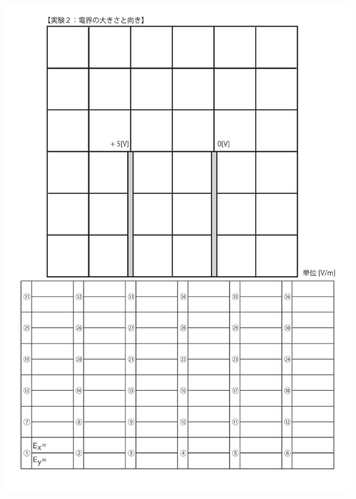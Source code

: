 \documentclass[uplatex,a4paper,11pt,oneside,openany]{jsbook}
\begin{document}
\includegraphics[scale=0.8]{./figure/E8.pdf}

\newpage
\end{document}
